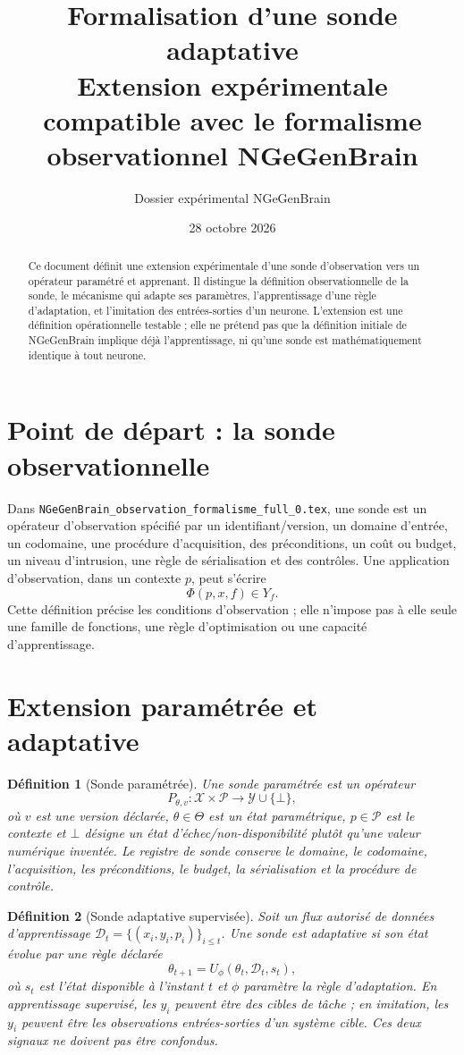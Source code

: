 \documentclass[11pt,a4paper]{article}
\title{\textbf{Formalisation d'une sonde adaptative}\\[.3em]\large Extension expérimentale compatible avec le formalisme observationnel NGeGenBrain}
\author{Dossier expérimental NGeGenBrain}
\date{28 octobre 2026}
\newtheorem{definition}{Définition}
\begin{document}
\maketitle
\begin{abstract}
Ce document définit une extension expérimentale d'une sonde d'observation vers un opérateur paramétré et apprenant. Il distingue la définition observationnelle de la sonde, le mécanisme qui adapte ses paramètres, l'apprentissage d'une règle d'adaptation, et l'imitation des entrées-sorties d'un neurone. L'extension est une définition opérationnelle testable ; elle ne prétend pas que la définition initiale de NGeGenBrain implique déjà l'apprentissage, ni qu'une sonde est mathématiquement identique à tout neurone.
\end{abstract}

\section{Point de départ : la sonde observationnelle}
Dans \texttt{NGeGenBrain\_observation\_formalisme\_full\_0.tex}, une sonde est un opérateur d'observation spécifié par un identifiant/version, un domaine d'entrée, un codomaine, une procédure d'acquisition, des préconditions, un coût ou budget, un niveau d'intrusion, une règle de sérialisation et des contrôles. Une application d'observation, dans un contexte $p$, peut s'écrire
\[
  \Phi(p,x,f)\in Y_f.
\]
Cette définition précise les conditions d'observation ; elle n'impose pas à elle seule une famille de fonctions, une règle d'optimisation ou une capacité d'apprentissage.

\section{Extension paramétrée et adaptative}
\begin{definition}[Sonde paramétrée]
Une sonde paramétrée est un opérateur
\[
 P_{\theta,v}:\mathcal X\times\mathcal P\longrightarrow\mathcal Y\cup\{\bot\},
\]
où $v$ est une version déclarée, $\theta\in\Theta$ est un état paramétrique, $p\in\mathcal P$ est le contexte et $\bot$ désigne un état d'échec/non-disponibilité plutôt qu'une valeur numérique inventée. Le registre de sonde conserve le domaine, le codomaine, l'acquisition, les préconditions, le budget, la sérialisation et la procédure de contrôle.
\end{definition}

\begin{definition}[Sonde adaptative supervisée]
Soit un flux autorisé de données d'apprentissage $\mathcal D_t=\{(x_i,y_i,p_i)\}_{i\leq t}$. Une sonde est adaptative si son état évolue par une règle déclarée
\[
 \theta_{t+1}=U_\phi(\theta_t,\mathcal D_t,s_t),
\]
où $s_t$ est l'état disponible à l'instant $t$ et $\phi$ paramètre la règle d'adaptation. En apprentissage supervisé, les $y_i$ peuvent être des cibles de tâche ; en imitation, les $y_i$ peuvent être les observations entrées-sorties d'un système cible. Ces deux signaux ne doivent pas être confondus.
\end{definition}
\end{document}

